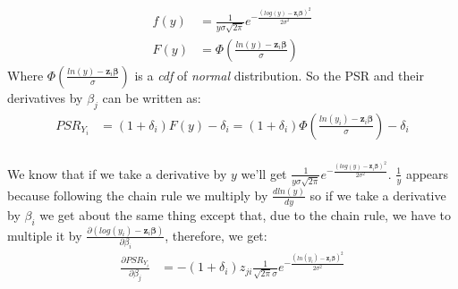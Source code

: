 \documentclass[]{article}
\begin{document}
  $$
  \begin{aligned}
    f(y) &= \frac{1}{y \sigma\sqrt{2 \pi }} e^{-\frac{(log(y) - \pmb{z}_i\pmb{\beta})^2}{2\sigma^2}}\\
    F(y) &= \Phi\left( \frac{ln(y) - \pmb{z}_i\pmb{\beta}}{\sigma}  \right)  %
  \end{aligned}
  $$
Where $\Phi\left( \frac{ln(y) - \pmb{z}_i\pmb{\beta}}{\sigma}  \right)$ is a \emph{cdf} of \emph{normal} distribution.
So the PSR and their derivatives by $\beta_j$ can be written as:
  $$
  \begin{aligned}
    PSR_{Y_i} &=  (1+\delta_i) F(y)  -  \delta_i = (1+\delta_i)\Phi\left( \frac{ln(y_i) - \pmb{z}_i\pmb{\beta}}{\sigma}  \right)  -  \delta_i\\
  \end{aligned}
  $$
  
We know that if we take a derivative by $y$ we'll get $\frac{1}{y \sigma\sqrt{2 \pi }} e^{-\frac{(log(y) - \pmb{z}_i\pmb{\beta})^2}{2\sigma^2}}$. $\frac{1}{y}$ appears because following the chain rule we multiply by $\frac{d ln(y)}{d y}$ so if we take a derivative by $\beta_i$ we get about the same thing except that, due to the chain rule, we have to multiple it by $  \frac{\partial \left(log(y_i) - \pmb{z}_i\pmb{\beta} \right)}{\partial \beta_i}  $, therefore, we get:
  $$
  \begin{aligned}
    \frac{\partial PSR_{Y_i}}{\partial \beta_j} &= -(1+\delta_i)z_{ji}   \frac{1}{\sqrt{2\pi} \sigma}    e^{ - \frac{\left( ln(y_i) -\pmb{z}_i\pmb{\beta} \right)^2}{2\sigma^2} } \\
  \end{aligned}
  $$
\end{document}
